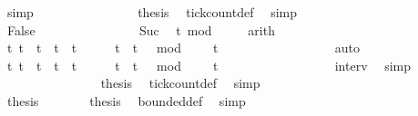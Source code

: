 \begin{isabellebody}
\ simp\isanewline
\ \ \ \ \ \ \ \ \ \ \ \ \ \ \isamarkupfalse%
\ {\isacharquery}thesis\ \isamarkupfalse%
\ tick{\isacharunderscore}count{\isacharunderscore}def\ \isamarkupfalse%
\ simp\isanewline
\ \ \ \ \ \ \ \ \ \ \isamarkupfalse%
\isanewline
\ \ \ \ \ \ \ \ \ \ \ \ \isamarkupfalse%
\ False\isanewline
\ \ \ \ \ \ \ \ \ \ \ \ \ \ \isamarkupfalse%
\ Suc\ \isamarkupfalse%
\ {\isacartoucheopen}t\ mod\ {}\ {\isacharequal}\ {}{\isacartoucheclose}\ \isamarkupfalse%
\ arith\isanewline
\ \ \ \ \ \ \ \ \ \ \ \ \ \ \isamarkupfalse%
\ {\isacartoucheopen}{\isacharbraceleft}t{\isachardot}\ {\isacharparenleft}t\ {\isacharequal}\ t\ {\isasymor}\ t\ {\isacharequal}\ t\ {\isacharplus}\ {}{\isacharparenright}\ {\isasymand}\ {}\ {\isasymle}\ t\ {\isasymand}\ {\isacharparenleft}t\ {\isacharminus}\ {}{\isacharparenright}\ mod\ {}\ {\isacharequal}\ {}{\isacharbraceright}\ {\isacharequal}\ {\isacharbraceleft}t\isanewline
\ \ \ \ \ \ \ \ \ \ \ \ \ \ \ \ \isamarkupfalse%
\ auto\ \isanewline
\ \ \ \ \ \ \ \ \ \ \ \ \ \ \isamarkupfalse%
\ {\isacartoucheopen}{\isacharbraceleft}t{\isachardot}\ t\ {\isasymle}\ t\ {\isasymand}\ t\ {\isacharless}\ t\ {\isacharplus}\ {}\ {\isasymand}\ {}\ {\isasymle}\ t\ {\isasymand}\ {\isacharparenleft}t\ {\isacharminus}\ {}{\isacharparenright}\ mod\ {}\ {\isacharequal}\ {}{\isacharbraceright}\ {\isacharequal}\ {\isacharbraceleft}t\isanewline
\ \ \ \ \ \ \ \ \ \ \ \ \ \ \ \ \isamarkupfalse%
\ interv{\isacharunderscore}{}\ \isamarkupfalse%
\ simp\isanewline
\ \ \ \ \ \ \ \ \ \ \ \ \ \ \isamarkupfalse%
\ {\isacharquery}thesis\ \isamarkupfalse%
\ tick{\isacharunderscore}count{\isacharunderscore}def\ \isamarkupfalse%
\ simp\isanewline
\ \ \ \ \ \ \ \ \ \ \isamarkupfalse%
\isanewline
\ \ \ \ \ \ \isamarkupfalse%
\isanewline
\ \ \ \ \isacommand{{\isacharbraceright}}\isamarkupfalse%
\isanewline
\ \ \ \ \isamarkupfalse%
\ {\isacharquery}thesis\ \isacommand{{\isachardot}{\isachardot}}\isamarkupfalse%
\isanewline
\ \ \isamarkupfalse%
\isanewline
\ \ \isamarkupfalse%
\ {\isacharquery}thesis\ \isamarkupfalse%
\ bounded{\isacharunderscore}def\ \isamarkupfalse%
\ simp\isanewline
{}\isamarkupfalse%
%
\endisatagproof
{\isafoldproof}%
%
\isadelimproof
\isanewline
%
\endisadelimproof
%
\isadelimtheory
\isanewline
%
\endisadelimtheory
%
\isatagtheory
{}\isamarkupfalse%
%
\endisatagtheory
{\isafoldtheory}%
%
\isadelimtheory
%
\endisadelimtheory
%
\end{isabellebody}%
